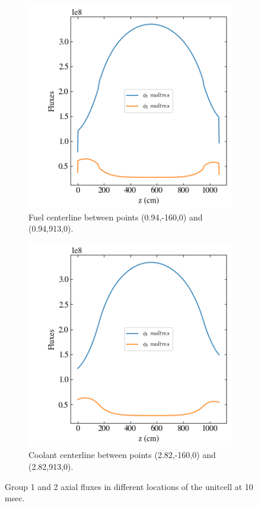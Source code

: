 \documentclass[11pt,letterpaper]{article}
\begin{document}
	\begin{figure}[htbp!]
		\centering
		\begin{subfigure}[t]{0.4\textwidth}
			\centering
			\includegraphics[width=\linewidth]{2D-unitcell-reflecB-action1}
			\caption{Fuel centerline between points (0.94,-160,0) and (0.94,913,0).}
		\end{subfigure}
		\begin{subfigure}[t]{0.4\textwidth}
			\centering
			\includegraphics[width=\linewidth]{2D-unitcell-reflecB-action2}
			\caption{Coolant centerline between points (2.82,-160,0) and (2.82,913,0).}
		\end{subfigure}
		\hfill
		\caption{Group 1 and 2 axial fluxes in different locations of the unitcell at 10 msec.}
		\label{fig:2D-unitcell-reflecB1}
	\end{figure}
\end{document}
